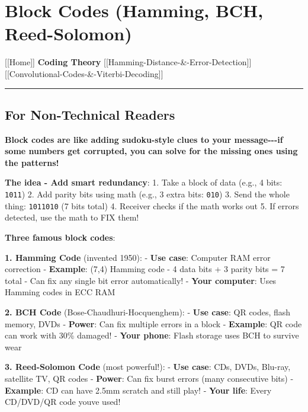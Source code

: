\section{Block Codes (Hamming, BCH,
Reed-Solomon)}\label{block-codes-hamming-bch-reed-solomon}

{[}{[}Home{]}{]} \textbar{} \textbf{Coding Theory} \textbar{}
{[}{[}Hamming-Distance-\&-Error-Detection{]}{]} \textbar{}
{[}{[}Convolutional-Codes-\&-Viterbi-Decoding{]}{]}

\begin{center}\rule{0.5\linewidth}{0.5pt}\end{center}

\subsection{\texorpdfstring{ For Non-Technical
Readers}{ For Non-Technical Readers}}\label{for-non-technical-readers}

\textbf{Block codes are like adding sudoku-style clues to your
message-\/-\/-if some numbers get corrupted, you can solve for the
missing ones using the patterns!}

\textbf{The idea - Add smart redundancy}: 1. Take a block of data (e.g.,
4 bits: \texttt{1011}) 2. Add parity bits using math (e.g., 3 extra
bits: \texttt{010}) 3. Send the whole thing: \texttt{1011010} (7 bits
total) 4. Receiver checks if the math works out 5. If errors detected,
use the math to FIX them!

\textbf{Three famous block codes}:

\textbf{1. Hamming Code} (invented 1950): - \textbf{Use case}: Computer
RAM error correction - \textbf{Example}: (7,4) Hamming code - 4 data
bits + 3 parity bits = 7 total - Can fix any single bit error
automatically! - \textbf{Your computer}: Uses Hamming codes in ECC RAM

\textbf{2. BCH Code} (Bose-Chaudhuri-Hocquenghem): - \textbf{Use case}:
QR codes, flash memory, DVDs - \textbf{Power}: Can fix multiple errors
in a block - \textbf{Example}: QR code can work with 30\% damaged! -
\textbf{Your phone}: Flash storage uses BCH to survive wear

\textbf{3. Reed-Solomon Code} (most powerful!): - \textbf{Use case}:
CDs, DVDs, Blu-ray, satellite TV, QR codes - \textbf{Power}: Can fix
burst errors (many consecutive bits) - \textbf{Example}: CD can have
2.5mm scratch and still play! - \textbf{Your life}: Every CD/DVD/QR code
you\textquotesingle ve used!

